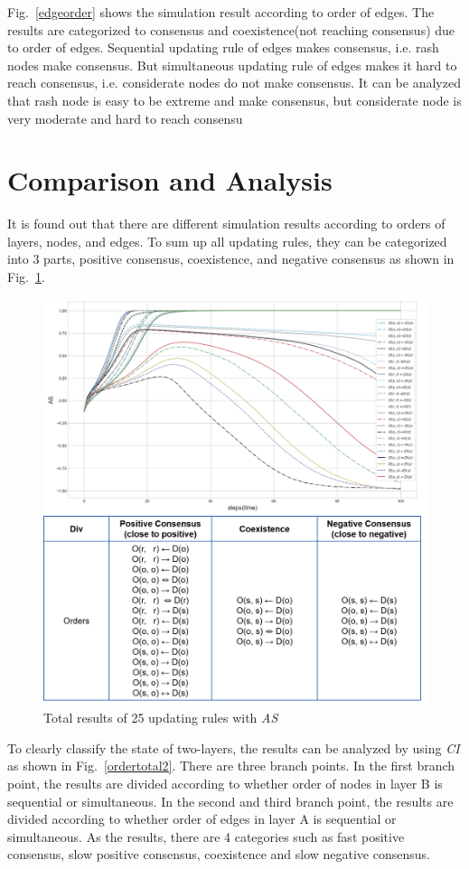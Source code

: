 Fig.~\ref{edgeorder} shows the simulation result according to order of edges. The results are categorized to consensus and coexistence(not reaching consensus) due to order of edges. Sequential updating rule of edges makes consensus, i.e. rash nodes make consensus. But simultaneous updating rule of edges makes it hard to reach consensus, i.e. considerate nodes do not make consensus. It can be analyzed that rash node is easy to be extreme and make consensus, but considerate node is very moderate and hard to reach consensu
 
\section{Comparison and Analysis}
It is found out that there are different simulation results according to orders of layers, nodes, and edges. To sum up all updating rules, they can be categorized into 3 parts, positive consensus, coexistence, and negative consensus as shown in Fig.~\ref{ordertotal}.  
\begin{figure}[!htb]
	\centering
	\includegraphics[width=\hsize]{figure/chap4_ordertotal.png}
	\caption{Total results of 25 updating rules with \textit{AS}}
	\label{ordertotal}
\end{figure}
To clearly classify the state of two-layers, the results can be analyzed by using \textit{CI} as shown in Fig.~\ref{ordertotal2}. There are three branch points. In the first branch point, the results are divided according to whether order of nodes in layer B is sequential or simultaneous. In the second and third branch point, the results are divided according to whether order of edges in layer A is sequential or simultaneous. As the results, there are 4 categories such as fast positive consensus, slow positive consensus, coexistence and slow negative consensus. 
